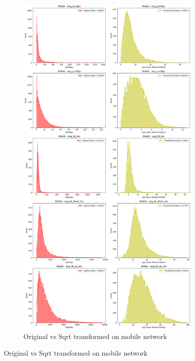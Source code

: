 \documentclass[
  letterpaper,
  DIV=11,
  numbers=noendperiod,
  oneside]{scrartcl}
\begin{document}
\begin{figure}
{\begin{figure}[H]

{\centering \includegraphics{data-analytics_files/figure-latex/fig-transcomp-output-2.png}

}

\caption{Original vs Sqrt transformed on mobile network}


\end{figure}}
\end{figure}
\end{document}

